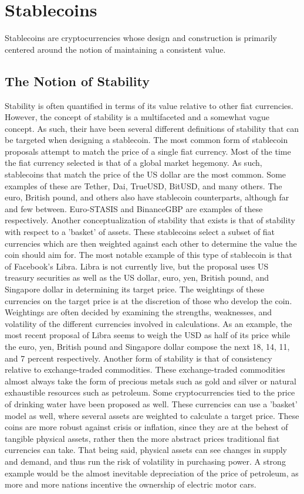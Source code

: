 \documentclass[bsc,frontabs,singlespacing,parskip,deptreport]{infthesis}
\begin{document}
    \section{Stablecoins}
    Stablecoins are cryptocurrencies whose design and construction is primarily centered around the notion of maintaining a consistent value.
    \subsection{The Notion of Stability}
    Stability is often quantified in terms of its value relative to other fiat currencies. However, the concept of stability is a multifaceted and a somewhat vague concept. As such, their have been several different definitions of stability that can be targeted when designing a stablecoin. 
    \smallbreak
    \noindent
    The most common form of stablecoin proposals attempt to match the price of a single fiat currency. Most of the time the fiat currency selected is that of a global market hegemony. As such, stablecoins that match the price of the US dollar are the most common. Some examples of these are Tether, Dai, TrueUSD, BitUSD, and many others. The euro, British pound, and others also have stablecoin counterparts, although far and few between. Euro-STASIS and BinanceGBP are examples of these respectively.
    \smallbreak
    \noindent 
    Another conceptualization of stability that exists is that of stability with respect to a 'basket' of assets. These stablecoins select a subset of fiat currencies which are then weighted against each other to determine the value the coin should aim for. The most notable example of this type of stablecoin is that of Facebook's Libra. Libra is not currently live, but the proposal uses US treasury securities as well as the US dollar, euro, yen, British pound, and Singapore dollar in determining its target price. The weightings of these currencies on the target price is at the discretion of those who develop the coin. Weightings are often decided by examining the strengths, weaknesses, and volatility of the different currencies involved in calculations. As an example, the most recent proposal of Libra seems to weigh the USD as half of its price while the euro, yen, British pound and Singapore dollar compose the next  18, 14, 11, and 7 percent respectively. 
    \smallbreak \noindent
    Another form of stability is that of consistency relative to exchange-traded commodities. These exchange-traded commodities almost always take the form of precious metals such as gold and silver or natural exhaustible resources such as petroleum. Some cryptocurrencies tied to the price of drinking water have been proposed as well. These currencies can use a 'basket' model as well, where several assets are weighted to calculate a target price. These coins are more robust against crisis or inflation, since they are at the behest of tangible physical assets, rather then the more abstract prices traditional fiat currencies can take. That being said, physical assets can see changes in supply and demand, and thus run the risk of volatility in purchasing power. A strong example would be the almost inevitable depreciation of the price of petroleum, as more and more nations incentive the ownership of electric motor cars. 
\end{document}
